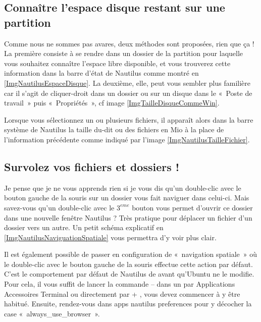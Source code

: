 \subsection{Connaître l'espace disque restant sur une partition}
\NautilusTaille
{}
Comme nous ne sommes pas avares, deux méthodes sont proposées, rien que ça ! La première consiste à se rendre dans un dossier de la partition pour laquelle vous souhaitez connaître l'espace libre disponible, et vous trouverez cette information dans la barre d'état de Nautilus comme montré en \ref{ImgNautilusEspaceDisque}. La deuxième, elle, peut vous sembler plus familière car il s'agit de cliquer-droit dans un dossier ou sur un disque dans le «~Poste de travail~» puis «~Propriétés~», cf image \ref{ImgTailleDisqueCommeWin}.
\begin{nota}
\label{RefTailleDossier}
Lorsque vous sélectionnez un ou plusieurs fichiers, il apparaît alors dans la barre système de Nautilus la taille du-dit ou des fichiers en Mio à la place de l'information précédente comme indiqué par l'image \ref{ImgNautilusTailleFichier}.
\end{nota}
\subsection{Survolez vos fichiers et dossiers !}
Je pense que je ne vous apprends rien si je vous dis qu'un double-clic avec le bouton gauche de la souris sur un dossier vous fait naviguer dans celui-ci. Mais savez-vous qu'un double-clic avec le $3^{eme}$ bouton vous permet d'ouvrir ce dossier dans une nouvelle fenêtre Nautilus ? Très pratique pour déplacer un fichier d'un dossier vers un autre. Un petit schéma explicatif en \ref{ImgNautilusNaviguationSpatiale} vous permettra d'y voir plus clair.\par
{}
\begin{nota}
Il est également possible de passer en configuration de «~navigation spatiale~» où le double-clic avec le bouton gauche de la souris effectue cette action par défaut. C'est le comportement par défaut de Nautilus de  avant qu'Ubuntu ne le modifie.\\
Pour cela, il vous suffit de lancer la commande  -- dans un  par Applications \FlecheDroite Accessoires \FlecheDroite Terminal ou directement par  + , vous devez commencer à y être habitué. Ensuite, rendez-vous dans apps \FlecheDroite nautilus \FlecheDroite preferences pour y décocher la case «~always\_use\_browser~».
\end{nota}
